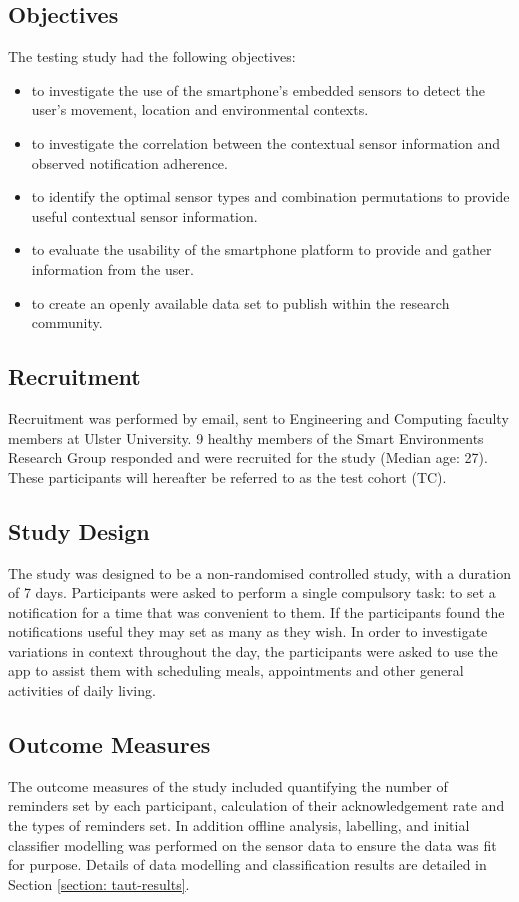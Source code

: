 \subsection{Objectives}
The testing study had the following objectives:
\begin{itemize}[noitemsep,topsep=0pt]
  \item to investigate the use of the smartphone’s embedded sensors to detect the user’s movement, location and environmental contexts.
  \item to investigate the correlation between the contextual sensor information and observed notification adherence.
  \item to identify the optimal sensor types and combination permutations to provide useful contextual sensor information.
  \item to evaluate the usability of the smartphone platform to provide and gather information from the user.
  \item to create an openly available data set to publish within the research community.
\end{itemize}

\subsection{Recruitment}
Recruitment was performed by email, sent to Engineering and Computing faculty members at Ulster University. 9 healthy members of the Smart Environments Research Group responded and were recruited for the study (Median age: 27). These participants will hereafter be referred to as the test cohort (TC).

\subsection{Study Design}
The study was designed to be a non-randomised controlled study, with a duration of 7 days. Participants were asked to perform a single compulsory task: to set a notification for a time that was convenient to them. If the participants found the notifications useful they may set as many as they wish. In order to investigate variations in context throughout the day, the participants were asked to use the app to assist them with scheduling meals, appointments and other general activities of daily living.

\subsection{Outcome Measures}
The outcome measures of the study included quantifying the number of reminders set by each participant, calculation of their acknowledgement rate and the types of reminders set. In addition offline analysis, labelling, and initial classifier modelling was performed on the sensor data to ensure the data was fit for purpose. Details of data modelling and classification results are detailed in Section \ref{section: taut-results}.

